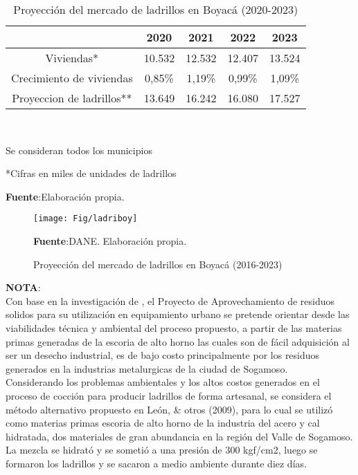 \documentclass[12pt]{article}
\begin{document}
\begin{table}[H]
  \centering
  \caption{Proyección del mercado de ladrillos en Boyacá (2020-2023)}
    \begin{tabular}{c c c c c}
          \hline
          & 2020  & 2021  & 2022  & 2023 \\
          \hline
          \hline
   Viviendas* & 10.532 & 12.532 & 12.407 & 13.524 \\
    Crecimiento de viviendas & 0,85\%  & 1,19\%  & 0,99\%  & 1,09\% \\
    Proyeccion de ladrillos** & 13.649 & 16.242 & 16.080 & 17.527 \\
    \hline
    \end{tabular}\\
    \raggedright  \scriptsize *Se consideran todos los municipios\\
    \raggedright  \scriptsize **Cifras en miles de unidades de ladrillos\\
\raggedright  \scriptsize \textbf{Fuente}:Elaboración propia.
  \label{tab:addlabel}%
\end{table}%











\begin{figure}[H]
  	\centering 		
  	\caption{Proyección del mercado de ladrillos en Boyacá (2016-2023)}
	\texttt{[image: Fig/ladriboy]}
\raggedright  \scriptsize \textbf{Fuente}:DANE. Elaboración propia.
	\label{A2}	
	\end{figure}

	
	
	
	
	
	\textbf{NOTA}:\\
Con base en la investigación de \cite{quijano2014implementacion}, el  Proyecto de Aprovechamiento
de residuos solidos para su utilización en equipamiento urbano se pretende orientar desde las viabilidades técnica y ambiental del proceso propuesto, a partir de las materias primas generadas de la escoria de alto horno las cuales son de fácil adquisición  al ser un desecho industrial, es de bajo costo principalmente por los residuos generados en la industrias metalurgicas  de la ciudad de Sogamoso.\\

Considerando los problemas ambientales y los altos costos generados en el proceso de cocción para producir ladrillos de forma artesanal, se considera el método alternativo propuesto en León, \& otros (2009), para lo cual se utilizó como materias primas escoria de alto horno de la industria del acero y cal hidratada, dos materiales de gran abundancia en la región del Valle de Sogamoso. La mezcla se hidrató y se sometió a una presión de 300 kgf/cm2, luego se formaron los ladrillos y se sacaron a medio ambiente durante diez días.\\
\end{document}
